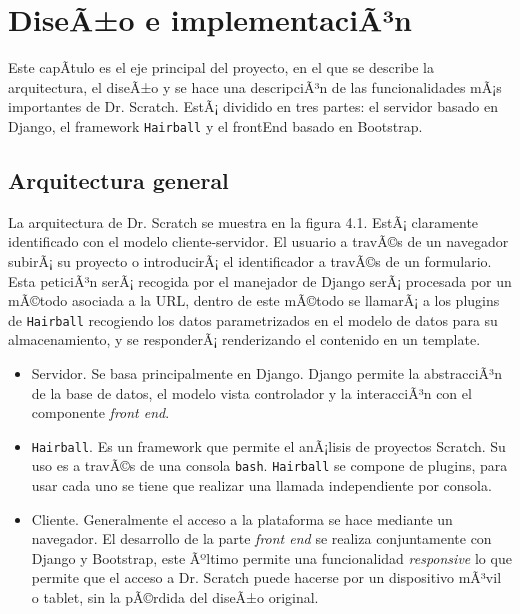 \documentclass[a4paper, 12pt]{book}
\begin{document}

\cleardoublepage
\chapter{DiseÃ±o e implementaciÃ³n}

Este capÃ­tulo es el eje principal del proyecto, en el que se describe la arquitectura,
el diseÃ±o y se hace una descripciÃ³n de las funcionalidades mÃ¡s importantes de Dr.
Scratch. EstÃ¡ dividido en tres partes: el servidor basado en Django, el framework
\texttt{Hairball} y el frontEnd basado en Bootstrap.

\section{Arquitectura general}
\label{sec:arquitectura}

La arquitectura de Dr. Scratch se muestra en la figura 4.1. EstÃ¡ claramente identificado
con el modelo cliente-servidor. El usuario a travÃ©s de un navegador subirÃ¡ su proyecto
o introducirÃ¡ el identificador a travÃ©s de un formulario. Esta peticiÃ³n serÃ¡ recogida 
por el manejador de Django serÃ¡ procesada por un mÃ©todo asociada a la URL, dentro de 
este mÃ©todo se llamarÃ¡ a los plugins de \texttt{Hairball} recogiendo los datos parametrizados en
el modelo de datos para su almacenamiento, y se responderÃ¡ renderizando el contenido
en un template.

\begin{itemize}
  \item Servidor. Se basa principalmente en Django. Django permite la abstracciÃ³n de la
	base de datos, el modelo vista controlador y la interacciÃ³n con el componente \emph{front end}.
  \item \texttt{Hairball}. Es un framework que permite el anÃ¡lisis de proyectos Scratch. Su uso es
	a travÃ©s de una consola \texttt{bash}. \texttt{Hairball} se compone de plugins, para usar cada uno se
	tiene que realizar una llamada independiente por consola.
  \item Cliente. Generalmente el acceso a la plataforma se hace mediante un navegador. El
	desarrollo de la parte \emph{front end} se realiza conjuntamente con Django y Bootstrap, este
	Ãºltimo permite una funcionalidad \emph{responsive} lo que permite que el acceso a Dr. Scratch
	puede hacerse por un dispositivo mÃ³vil o tablet, sin la pÃ©rdida del diseÃ±o original.
	
\end{itemize}
\end{document}
